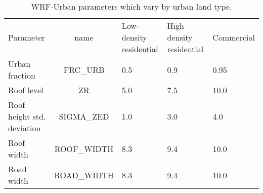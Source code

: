 \documentclass[draft,linenumbers]{agujournal}
\begin{document}
\begin{table}

\begin{tabular}{lclll}
Parameter & name & Low-density residential & High density residential & Commercial \\
Urban fraction &  \textsc{FRC\_URB} & 0.5 & 0.9 & 0.95 \\
Roof level &\textsc{ZR} &5.0&  7.5 & 10.0 \\
Roof height std. deviation & \textsc{SIGMA\_ZED} & 1.0 &  3.0 &  4.0\\
Roof width &  \textsc{ROOF\_WIDTH} & 8.3& 9.4 & 10.0 \\
Road width & \textsc{ROAD\_WIDTH} &  8.3&  9.4&  10.0 
\end{tabular} 
\caption{WRF-Urban parameters which vary by urban land type. }

\end{table}
%
% 



%
%
%
%
\end{document}
